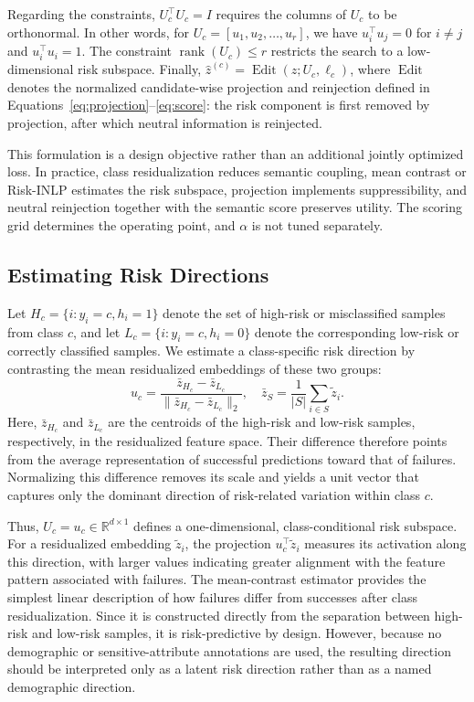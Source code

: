 Regarding the constraints, \(U_c^{\top}U_c=I\) requires the columns of \(U_c\) to be orthonormal. In other words, for \(U_c=[u_1,u_2,\ldots,u_r]\), we have \(u_i^{\top}u_j=0\) for \(i\neq j\) and \(u_i^{\top}u_i=1\). The constraint \(\operatorname{rank}(U_c)\le r\) restricts the search to a low-dimensional risk subspace. Finally, \(\hat z^{(c)}=\operatorname{Edit}(z;U_c,\ell_c)\), where \(\operatorname{Edit}\) denotes the normalized candidate-wise projection and reinjection defined in Equations~\ref{eq:projection}--\ref{eq:score}: the risk component is first removed by projection, after which neutral information is reinjected.

This formulation is a design objective rather than an additional jointly optimized loss. In practice, class residualization reduces semantic coupling, mean contrast or Risk-INLP estimates the risk subspace, projection implements suppressibility, and neutral reinjection together with the semantic score preserves utility. The scoring grid determines the operating point, and \(\alpha\) is not tuned separately.


\subsection{Estimating Risk Directions}
Let $H_c=\{i:y_i=c,h_i=1\}$ denote the set of high-risk or misclassified samples from class $c$, and let $L_c=\{i:y_i=c,h_i=0\}$ denote the corresponding low-risk or correctly classified samples. We estimate a class-specific risk direction by contrasting the mean residualized embeddings of these two groups:
\begin{equation}
 u_c=\frac{\bar z_{H_c}-\bar z_{L_c}}
 {\|\bar z_{H_c}-\bar z_{L_c}\|_2},
 \quad
 \bar z_S=\frac{1}{|S|}\sum_{i\in S}\tilde z_i.
 \label{eq:contrast}
\end{equation}
Here, $\bar z_{H_c}$ and $\bar z_{L_c}$ are the centroids of the high-risk and low-risk samples, respectively, in the residualized feature space. Their difference therefore points from the average representation of successful predictions toward that of failures. Normalizing this difference removes its scale and yields a unit vector that captures only the dominant direction of risk-related variation within class $c$.

Thus, $U_c=u_c\in\mathbb{R}^{d\times1}$ defines a one-dimensional, class-conditional risk subspace. For a residualized embedding $\tilde z_i$, the projection $u_c^\top \tilde z_i$ measures its activation along this direction, with larger values indicating greater alignment with the feature pattern associated with failures. The mean-contrast estimator provides the simplest linear description of how failures differ from successes after class residualization. Since it is constructed directly from the separation between high-risk and low-risk samples, it is risk-predictive by design. However, because no demographic or sensitive-attribute annotations are used, the resulting direction should be interpreted only as a latent risk direction rather than as a named demographic direction.

